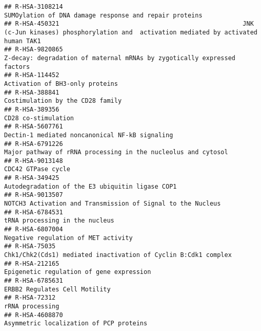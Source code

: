 \documentclass[
]{article}
\begin{document}
\begin{verbatim}
## R-HSA-3108214                                                                               SUMOylation of DNA damage response and repair proteins
## R-HSA-450321                                                  JNK (c-Jun kinases) phosphorylation and  activation mediated by activated human TAK1
## R-HSA-9820865                                                              Z-decay: degradation of maternal mRNAs by zygotically expressed factors
## R-HSA-114452                                                                                                       Activation of BH3-only proteins
## R-HSA-388841                                                                                                      Costimulation by the CD28 family
## R-HSA-389356                                                                                                                   CD28 co-stimulation
## R-HSA-5607761                                                                                       Dectin-1 mediated noncanonical NF-kB signaling
## R-HSA-6791226                                                                        Major pathway of rRNA processing in the nucleolus and cytosol
## R-HSA-9013148                                                                                                                   CDC42 GTPase cycle
## R-HSA-349425                                                                                       Autodegradation of the E3 ubiquitin ligase COP1
## R-HSA-9013507                                                                          NOTCH3 Activation and Transmission of Signal to the Nucleus
## R-HSA-6784531                                                                                                       tRNA processing in the nucleus
## R-HSA-6807004                                                                                                  Negative regulation of MET activity
## R-HSA-75035                                                                         Chk1/Chk2(Cds1) mediated inactivation of Cyclin B:Cdk1 complex
## R-HSA-212165                                                                                              Epigenetic regulation of gene expression
## R-HSA-6785631                                                                                                        ERBB2 Regulates Cell Motility
## R-HSA-72312                                                                                                                        rRNA processing
## R-HSA-4608870                                                                                              Asymmetric localization of PCP proteins

\end{verbatim}
\end{document}
